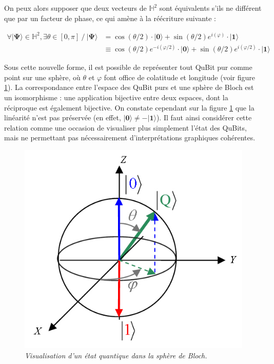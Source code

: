 \documentclass[a4paper,12pt]{report}
\newcommand{\quSt}[1]{\bm{|#1\rangle}}
\newcommand{\para}[1]{\par{#1}\\}
\begin{document}
\vspace{1\baselineskip}

\par{
	On peux alors supposer que deux vecteurs de $\mathbb{H}^2$ sont équivalents s'ils ne différent que par un facteur de phase, ce qui amène à la réécriture suivante :
}

\begin{align}
	\label{blochEq}
	\forall \quSt{\Psi} \in \mathbb{H}^2 , \exists \theta \in [0, \pi] ~/~ \quSt{\Psi} &= \cos(\theta/2) \cdot \quSt{0} + \sin(\theta/2) e^{i(\varphi)} \cdot \quSt{1} \\
	&\equiv \cos(\theta/2) e^{-i(\varphi/2)} \cdot \quSt{0} + \sin(\theta/2) e^{i(\varphi/2)} \cdot \quSt{1}
\end{align}

\vspace{1\baselineskip}

\para{
Sous cette nouvelle forme, il est possible de représenter tout QuBit pur comme point sur une sphère, où $\theta$ et $\varphi$ font office de colatitude et longitude (voir figure \ref{bloch}). La correspondance entre l'espace des QuBit purs et une sphère de Bloch est un isomorphisme : une application bijective entre deux espaces, dont la réciproque est également bijective. On constate cependant sur la figure \ref{bloch} que la linéarité n'est pas préservée (en effet, $\quSt{0} \neq -\quSt{1}$). Il faut ainsi considérer cette relation comme une occasion de visualiser plus simplement l'état des QuBits, mais ne permettant pas nécessairement d'interprétations graphiques cohérentes.
}

\begin{figure}
	\begin{center}
		\includegraphics[scale=0.60]{images/bloch}
	\end{center}
	\caption{\textit{Visualisation d'un état quantique dans la sphère de Bloch.}}
	\label{bloch}
\end{figure}
\end{document}
